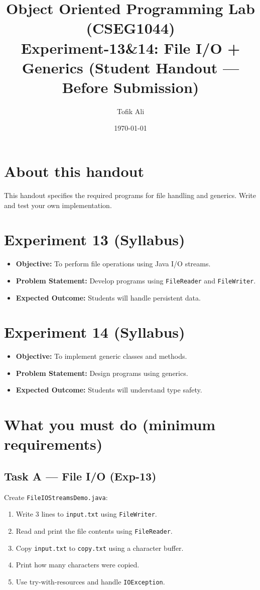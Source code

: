 \documentclass[11pt]{article}
\title{Object Oriented Programming Lab (CSEG1044)\\Experiment-13\&14: File I/O + Generics (Student Handout --- Before Submission)}
\author{Tofik Ali}
\date{\today}
\begin{document}
\maketitle
\tableofcontents

\section{About this handout}
This handout specifies the required programs for file handling and generics.
Write and test your own implementation.

\section{Experiment 13 (Syllabus)}
\begin{itemize}[leftmargin=*]
  \item \textbf{Objective:} To perform file operations using Java I/O streams.
  \item \textbf{Problem Statement:} Develop programs using \texttt{FileReader} and \texttt{FileWriter}.
  \item \textbf{Expected Outcome:} Students will handle persistent data.
\end{itemize}

\section{Experiment 14 (Syllabus)}
\begin{itemize}[leftmargin=*]
  \item \textbf{Objective:} To implement generic classes and methods.
  \item \textbf{Problem Statement:} Design programs using generics.
  \item \textbf{Expected Outcome:} Students will understand type safety.
\end{itemize}

\section{What you must do (minimum requirements)}

\subsection{Task A --- File I/O (Exp-13)}
Create \texttt{FileIOStreamsDemo.java}:
\begin{enumerate}[leftmargin=*]
  \item Write 3 lines to \texttt{input.txt} using \texttt{FileWriter}.
  \item Read and print the file contents using \texttt{FileReader}.
  \item Copy \texttt{input.txt} to \texttt{copy.txt} using a character buffer.
  \item Print how many characters were copied.
  \item Use try-with-resources and handle \texttt{IOException}.
\end{enumerate}
\end{document}
